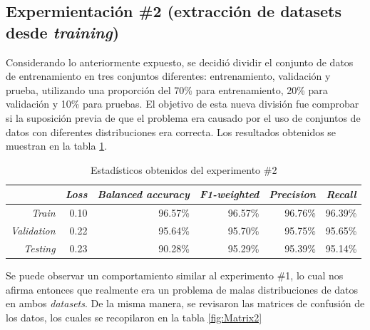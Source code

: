 \subsection{Expermientación \#2 (extracción de datasets desde \textit{training}) }
Considerando lo anteriormente expuesto, se decidió dividir el conjunto de datos de entrenamiento en tres conjuntos diferentes: entrenamiento, validación y prueba, utilizando una proporción del 70\% para entrenamiento, 20\% para validación y 10\% para pruebas. El objetivo de esta nueva división fue comprobar si la suposición previa de que el problema era causado por el uso de conjuntos de datos con diferentes distribuciones era correcta. Los resultados obtenidos se muestran en la tabla \ref{table:Results4}.
\\
\begin{table}[h!]
\footnotesize
\centering
\begin{tabular}{|r|r|r|r|r|r|}
\hline
           & \multicolumn{1}{c|}{\textit{Loss}} & \multicolumn{1}{c|}{\textit{Balanced accuracy}} & \multicolumn{1}{c|}{\textit{F1-weighted}} & \multicolumn{1}{c|}{\textit{Precision}} & \multicolumn{1}{c|}{\textit{Recall}} \\ \hline
\textit{Train}      & 0.10                      & 96.57\%                        & 96.57\%                 & 96.76\%                         & 96.39\%                     \\ \hline
\textit{Validation} & 0.22                      & 95.64\%                        & 95.70\%                 & 95.75\%                         & 95.65\%                     \\ \hline
\textit{Testing}    & 0.23                      & 90.28\%                       & 95.29\%                & 95.39\%                       & 95.14\%                    \\ \hline
\end{tabular}
\caption{Estadísticos obtenidos del experimento \#2}
\label{table:Results4}
\end{table}

Se puede observar un comportamiento similar al experimento \#1, lo cual nos afirma entonces que realmente era un problema de malas distribuciones de datos en ambos \textit{datasets}. De la misma manera, se revisaron las matrices de confusión de los datos, los cuales se recopilaron en la tabla \ref{fig:Matrix2}

